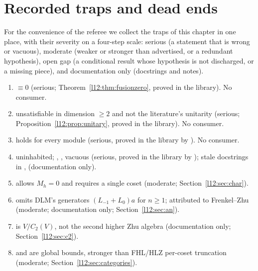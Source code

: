 \section{Recorded traps and dead ends}\label{l12:sec:traps}

For the convenience of the referee we collect the traps of this chapter in one place, with their severity on a four-step scale:
serious (a statement that is wrong or vacuous), moderate (weaker or stronger than advertised, or a redundant
hypothesis), open gap (a conditional result whose hypothesis is not discharged, or a missing piece), and documentation
only (docstrings and notes).
\begin{enumerate}
\item {} $\equiv0$ (serious; Theorem~\ref{l12:thm:fusionzero}, proved in the library). No consumer.
\item {} unsatisfiable in dimension $\ge2$ and not the literature's unitarity (serious;
  Proposition~\ref{l12:prop:unitary}, proved in the library). No consumer.
\item {} holds for every module (serious, proved in the library by
  \allowbreak{}\allowbreak{}). No consumer.
\item {} uninhabited; , \allowbreak{}\allowbreak{},
  \allowbreak{}\allowbreak{} vacuous (serious, proved in the library by \allowbreak{}\allowbreak{});
  stale docstrings in ,  (documentation only).
\item {} allows $M_h = 0$ and requires a single coset (moderate; Section~\ref{l12:sec:char}).
\item {} omits DLM's generators $(L_{-1}+L_0)a$ for $n\ge1$;  attributed to Frenkel--Zhu (moderate; documentation only;
  Section~\ref{l12:sec:an}).
\item {} is $V/C_2(V)$, not the second higher Zhu algebra (documentation only; Section~\ref{l12:sec:c2}).
\item {} and  are global bounds, stronger than FHL/HLZ per-coset
  truncation (moderate; Section~\ref{l12:sec:categories}).

\end{enumerate}
